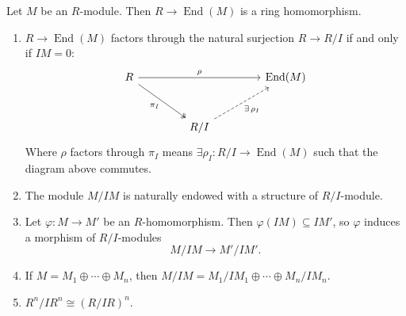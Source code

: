 \begin{proposition}
    Let $M$ be an $R$-module. Then $R \to \operatorname{End}(M)$ is a ring homomorphism.
    \begin{enumerate}
        \item $R \to \operatorname{End}(M)$ factors through the natural surjection $R \to R/I$ if and only if $IM = 0$:
              \[
                  \begin{tikzcd}[row sep=2.8em, column sep=4.2em]
                      R \arrow[rr, "\rho"] \arrow[dr, two heads, "\pi_{I}"'] && \operatorname{End}(M) \\
                      & R/I \arrow[ur, dashed, "\exists\,\rho_{I}"'] &
                  \end{tikzcd}
              \]
              Where $\rho$ factors through $\pi_I$ means $\exists \rho_{I}: R/I \to \operatorname{End}(M)$ such that the diagram above commutes.
        \item The module $M/IM$ is naturally endowed with a structure of $R/I$-module.
        \item Let $\varphi: M \to M'$ be an $R$-homomorphism. Then $\varphi(IM) \subseteq IM'$, so $\varphi$ induces a morphism of $R/I$-modules
              \[
                  M/IM \to M'/IM'.
              \]
        \item If $M=M_1 \oplus \cdots \oplus M_n$, then $M/IM = M_1/IM_1 \oplus \cdots \oplus M_n/IM_n$.
        \item $R^n/IR^n \cong (R/IR)^n$.
    \end{enumerate}
\end{proposition}

